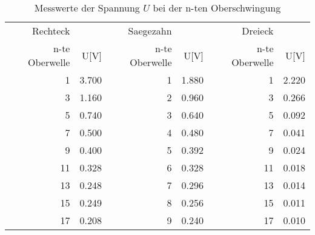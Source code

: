 
\begin{table}[!h]
\begin{center}
\begin{tabular}{|r|r|r|r|r|r|}
\hline
 Rechteck & & Saegezahn & & Dreieck & \\
 n-te Oberwelle & U[V] & n-te Oberwelle & U[V] & n-te Oberwelle & U[V] \\
\hline
\hline
1	& 3.700 & 1	& 1.880 & 1	& 2.220 \\
3	& 1.160 & 2	& 0.960 & 3	& 0.266 \\
5	& 0.740 & 3	& 0.640 & 5	& 0.092 \\
7	& 0.500 & 4	& 0.480 & 7	& 0.041 \\
9	& 0.400 & 5	& 0.392 & 9	& 0.024 \\
11	& 0.328 & 6	& 0.328 & 11& 0.018 \\
13	& 0.248 & 7	& 0.296 & 13& 0.014 \\
15	& 0.249 & 8	& 0.256 & 15& 0.011 \\
17	& 0.208 & 9	& 0.240 & 17& 0.010 \\
\hline
\end{tabular}
\caption[]{Messwerte der Spannung $U$ bei der n-ten Oberschwingung}
\label{tab:messwerte}
\end{center}
\end{table}